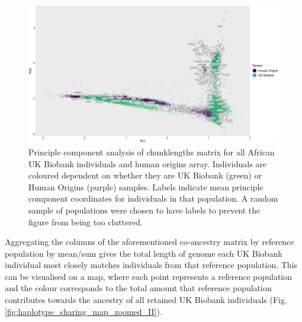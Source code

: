 \begin{figure}[htp]
    \centering
    \includegraphics[width=1.0\textwidth]{../images/chapter3/PCA_chunklengths_HumanOrigins_UKBiobank.png}
    \caption{Principle component analysis of chunklengths matrix for all African UK Biobank individuals and human origins array. Individuals are coloured dependent on whether they are UK Biobank (green) or Human Origins (purple) samples. Labels indicate mean principle component coordinates for individuals in that population. A random sample of populations were chosen to have labels to prevent the figure from being too cluttered.}
    \label{fig:/PCA_chunklengths_HumanOrigins_UKBiobank}
\end{figure}

Aggregating the columns of the aforementioned co-ancestry matrix by reference population by mean/sum gives the total length of genome each UK Biobank individual most closely matches individuals from that reference population. This can be visualised on a map, where each point represents a reference population and the colour corresponds to the total amount that reference population contributes towards the ancestry of all retained UK Biobank individuals (Fig. \ref{fig:haplotype_sharing_map_zoomed_II}).

